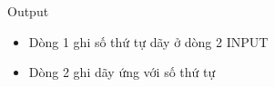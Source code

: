 Output
\begin{itemize}
	\item Dòng 1 ghi số thứ tự dãy ở dòng 2 INPUT
	\item Dòng 2 ghi dãy ứng với số thứ tự
\end{itemize}

 
